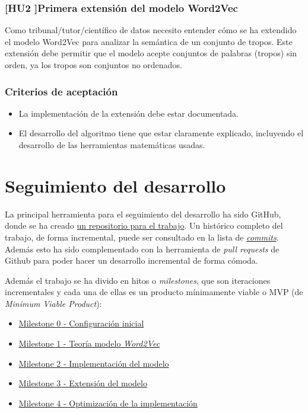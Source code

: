 \subsubsection{[HU2 ]Primera extensión del modelo Word2Vec}\label{uc:word2vec_primera_extension}

Como tribunal/tutor/científico de datos
necesito entender cómo se ha extendido el modelo Word2Vec para analizar la semántica de un conjunto de
tropos. Este extensión debe permitir que el modelo acepte conjuntos de palabras (tropos) sin orden, ya
los tropos son conjuntos no ordenados.

\subsubsection{Criterios de aceptación}

\begin{itemize}
      \item La implementación de la extensión debe estar documentada.
      \item El desarrollo del algoritmo tiene que estar claramente explicado, incluyendo el desarrollo de las herramientas matemáticas usadas.
\end{itemize}

\section{Seguimiento del desarrollo}

La principal herramienta para el seguimiento del desarrollo ha sido GitHub, donde se ha creado \href{https://github.com/antoniogamiz/tfg}{un repositorio para el trabajo}.
Un histórico completo del trabajo, de forma incremental, puede ser consultado en la lista de \href{https://github.com/antoniogamiz/tfg/commits/main}{\textit{commits}}.
Además esto ha sido complementado con la herramienta de \textit{pull requests} de Github para poder hacer un desarrollo incremental de forma cómoda.

Además el trabajo se ha divido en hitos o \textit{milestones}, que son iteraciones incrementales y cada una de ellas es un producto mínimamente viable o MVP
(de \textit{Minimum Viable Product}):

\begin{itemize}
      \item \href{https://github.com/antoniogamiz/tfg/milestone/1}{Milestone 0 - Configuración inicial}
      \item \href{https://github.com/antoniogamiz/tfg/milestone/4}{Milestone 1 - Teoría modelo \textit{Word2Vec}}
      \item \href{https://github.com/antoniogamiz/tfg/milestone/6}{Milestone 2 - Implementación del modelo}
      \item \href{https://github.com/antoniogamiz/tfg/milestone/7}{Milestone 3 - Extensión del modelo}
      \item \href{https://github.com/antoniogamiz/tfg/milestone/8}{Milestone 4 - Optimización de la implementación}
\end{itemize}
